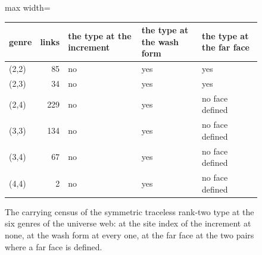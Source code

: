 \begin{figure}[h]\centering
\begin{adjustbox}{max width=\linewidth}\begin{tabular}{lrlll}\toprule
genre & links & the type at the increment & the type at the wash form & the type at the far face \\ \midrule
(2,2) & 85 & no & yes & yes \\
(2,3) & 34 & no & yes & yes \\
(2,4) & 229 & no & yes & no face defined \\
(3,3) & 134 & no & yes & no face defined \\
(3,4) & 67 & no & yes & no face defined \\
(4,4) & 2 & no & yes & no face defined \\ \bottomrule
\end{tabular}\end{adjustbox}
\caption{The carrying census of the symmetric traceless rank-two type at the six genres of the universe web: at the site index of the increment at none, at the wash form at every one, at the far face at the two pairs where a far face is defined.}
\end{figure}
\par\medskip{}\label{narr:close:1-2}\par
